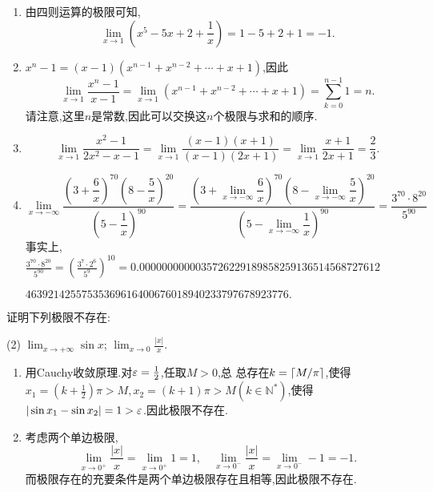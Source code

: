 \begin{enumerate}[(1)]
    \item 由四则运算的极限可知, $$\lim_{x \to 1} \left(x^5 - 5x + 2 + \frac{1}{x}\right) = 1 - 5 + 2 + 1 = -1.$$
    \item $x^n - 1 = (x-1)(x^{n-1} + x^{n-2} + \cdots + x + 1)$,因此$$\lim_{x \to 1} \frac{x^n - 1}{x - 1} = \lim_{x \to 1} (x^{n-1} + x^{n-2} + \cdots + x + 1) = \sum_{k=0}^{n-1} 1 = n.$$
          请注意,这里$n$是常数,因此可以交换这$n$个极限与求和的顺序.
    \item $$\lim_{x \to 1} \frac{x^2-1}{2x^2-x-1} = \lim_{x \to 1} \frac{(x-1)(x+1)}{(x-1)(2x+1)} = \lim_{x \to 1} \frac{x+1}{2x+1} = \frac{2}{3}.$$
    \item $$\lim_{x \to -\infty} \frac{ \left( 3 + \dfrac{6}{x} \right)^{70} (8 - \dfrac{5}{x})^{20} }{ \left( 5 - \dfrac{1}{x} \right)^{90} } = \frac{ \left( 3 + \displaystyle \lim_{x \to -\infty} \dfrac{6}{x} \right)^{70} \left( 8 - \displaystyle  \lim_{x \to -\infty} \dfrac{5}{x} \right)^{20} }{ \left( 5 - \displaystyle  \lim_{x \to -\infty} \dfrac{1}{x} \right)^{90} } = \frac{3^{70} \cdot 8^{20}}{5^{90}}$$
          事实上, $\frac{3^{70} \cdot 8^{20}}{5^{90}} = \left( \frac{3^7 \cdot 2^6}{5^9} \right)^{10} =0.0000000000035726229189858259136514568727612$

          $46392142557535369616400676018940233797678923776.$
\end{enumerate}

\begin{exercise}[1.3.3]\label{exe:1.3.3}
    证明下列极限不存在:
    \begin{tasks}[label=(\arabic*)](2)
        \task $\lim_{x \to +\infty} \sin x$;
        \task $\lim_{x \to 0} \frac{|x|}{x}$.
    \end{tasks}
\end{exercise}

\begin{enumerate}[(1)]
    \item 用Cauchy收敛原理.对$\ve = \frac{1}{2}$,任取$M > 0$,总
          总存在$k = \llceil M / \pi \rrceil$,使得$x_1 = \left(k+\frac{1}{2}\right)\pi> M, x_2 = (k + 1)\pi > M (k \in \mathbb{N}^*)$,使得$|\sin x_1 - \sin x_2| = 1 > \ve$.因此极限不存在.
    \item 考虑两个单边极限, $$\lim_{x \to 0^+} \frac{|x|}{x} = \lim_{x \to 0^+} 1 = 1, \quad \lim_{x \to 0^-} \frac{|x|}{x} = \lim_{x \to 0^-} -1 = -1.$$
          而极限存在的充要条件是两个单边极限存在且相等,因此极限不存在.
\end{enumerate}

